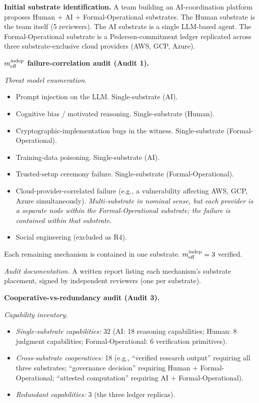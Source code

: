 \textbf{Initial substrate identification.}  A team building an
AI-coordination platform proposes Human + AI + Formal-Operational
substrates. The Human substrate is the team itself (5 reviewers).
The AI substrate is a single LLM-based agent. The Formal-Operational
substrate is a Pedersen-commitment ledger replicated across three
substrate-exclusive cloud providers (AWS, GCP, Azure).

\textbf{$m_{\mathrm{eff}}^{\mathrm{indep}}$ failure-correlation audit (Audit 1).}

\emph{Threat model enumeration.}
\begin{itemize}
\item Prompt injection on the LLM. Single-substrate (AI).
\item Cognitive bias / motivated reasoning. Single-substrate (Human).
\item Cryptographic-implementation bugs in the witness. Single-substrate (Formal-Operational).
\item Training-data poisoning. Single-substrate (AI).
\item Trusted-setup ceremony failure. Single-substrate (Formal-Operational).
\item Cloud-provider-correlated failure (e.g., a vulnerability
  affecting AWS, GCP, Azure simultaneously). \emph{Multi-substrate
  in nominal sense, but each provider is a separate node within the
  Formal-Operational substrate; the failure is contained within that
  substrate.}
\item Social engineering (excluded as R4).
\end{itemize}

Each remaining mechanism is contained in one substrate. $m_{\mathrm{eff}}^{\mathrm{indep}} =
3$ verified.

\emph{Audit documentation.}  A written report listing each
mechanism's substrate placement, signed by independent reviewers
(one per substrate).

\textbf{Cooperative-vs-redundancy audit (Audit 3).}

\emph{Capability inventory.}
\begin{itemize}
\item \emph{Single-substrate capabilities:} 32 (AI: 18 reasoning
  capabilities; Human: 8 judgment capabilities; Formal-Operational:
  6 verification primitives).
\item \emph{Cross-substrate cooperatives:} 18 (e.g., ``verified
  research output'' requiring all three substrates; ``governance
  decision'' requiring Human + Formal-Operational; ``attested
  computation'' requiring AI + Formal-Operational).
\item \emph{Redundant capabilities:} 3 (the three ledger replicas).
\end{itemize}

